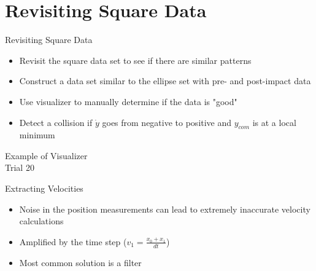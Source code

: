 \section{Revisiting Square Data}

\begin{frame}{Revisiting Square Data}
    \begin{itemize}
        \item Revisit the square data set to see if there are similar patterns
        \item Construct a data set similar to the ellipse set with pre- and post-impact data
        \item Use visualizer to manually determine if the data is "good"
        \item Detect a collision if $\dot{y}$ goes from negative to positive and $y_{com}$ is at a local minimum
    \end{itemize}
\end{frame}

\begin{frame}{Example of Visualizer}
    \centering
    \\
    \centering
    Trial 20
\end{frame}

\begin{frame}{Extracting Velocities}
    \begin{itemize}
        \item Noise in the position measurements can lead to extremely inaccurate velocity calculations
        \item  Amplified by the time step ($v_1 = \frac{x_0 + x_1}{dt}$)
        \item Most common solution is a filter
    \end{itemize}
    
\end{frame}

